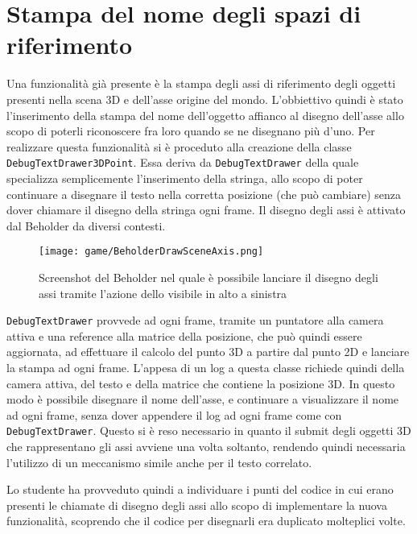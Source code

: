 \section{Stampa del nome degli spazi di riferimento}
\label{sec:stampa-del-nome-degli-spazi-di-riferimento}

Una funzionalità già presente è la stampa degli assi di riferimento degli oggetti presenti nella scena 3D e dell'asse origine del mondo. L'obbiettivo quindi è stato l'inserimento della stampa del nome dell'oggetto affianco al disegno dell'asse allo scopo di poterli riconoscere fra loro quando se ne disegnano più d'uno. Per realizzare questa funzionalità si è proceduto alla creazione della classe \texttt{DebugTextDrawer3DPoint}. Essa deriva da \texttt{DebugTextDrawer} della quale specializza semplicemente l'inserimento della stringa, allo scopo di poter continuare a disegnare il testo nella corretta posizione (che può cambiare) senza dover chiamare il disegno della stringa ogni frame. Il disegno degli assi è attivato dal Beholder da diversi contesti.\\

\begin{figure}[h!] 
	\centering 
	\hspace*{-0.05\columnwidth}\texttt{[image: game/BeholderDrawSceneAxis.png]} 
	\caption{Screenshot del Beholder nel quale è possibile lanciare il disegno degli assi tramite l'azione  dello  visibile in alto a sinistra}
\end{figure}

\texttt{DebugTextDrawer} provvede ad ogni frame, tramite un puntatore alla camera attiva e una reference alla matrice della posizione, che può quindi essere aggiornata, ad effettuare il calcolo del punto 3D a partire dal punto 2D e lanciare la stampa ad ogni frame. L'appesa di un log a questa classe richiede quindi della camera attiva, del testo e della matrice che contiene la posizione 3D. In questo modo è possibile disegnare il nome dell'asse, e continuare a visualizzare il nome ad ogni frame, senza dover appendere il log ad ogni frame come con \texttt{DebugTextDrawer}. Questo si è reso necessario in quanto il submit degli oggetti 3D che rappresentano gli assi avviene una volta soltanto, rendendo quindi necessaria l'utilizzo di un meccanismo simile anche per il testo correlato.

Lo studente ha provveduto quindi a individuare i punti del codice in cui erano presenti le chiamate di disegno degli assi allo scopo di implementare la nuova funzionalità, scoprendo che il codice per disegnarli era duplicato molteplici volte.\\

